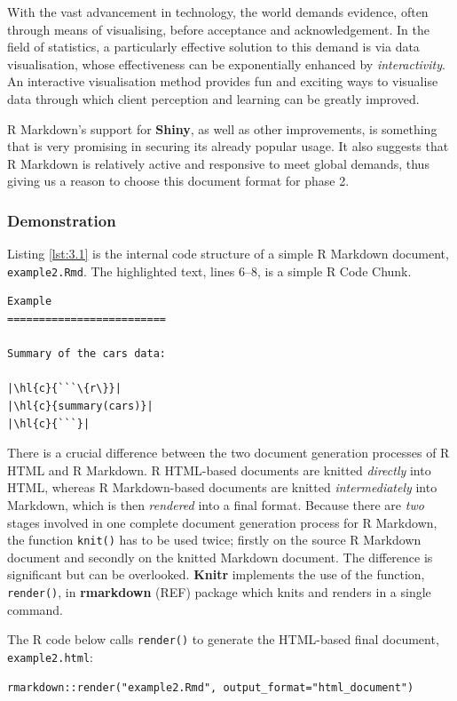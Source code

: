 \documentclass[a4paper, 12pt]{report}
\begin{document}
With the vast advancement in technology, the world demands evidence, often through means of visualising, before acceptance and acknowledgement. In the field of statistics, a particularly effective solution to this demand is via data visualisation, whose effectiveness can be exponentially enhanced by \emph{interactivity}. An interactive visualisation method provides fun and exciting ways to visualise data through which client perception and learning can be greatly improved.

R Markdown's support for \textbf{Shiny}, as well as other improvements, is something that is very promising in securing its already popular usage. It also suggests that R Markdown is relatively active and responsive to meet global demands, thus giving us a reason to choose this document format for phase 2.

\subsubsection*{Demonstration}
Listing \ref{lst:3.1} is the internal code structure of a simple R Markdown document, \texttt{example2.Rmd}. The highlighted text, lines 6--8, is a simple R Code Chunk.

\begin{lstlisting}[caption={\texttt{example2.Rmd}}, escapechar=\|, label={lst:3.1}]
Example
=========================

Summary of the cars data:

|\hl{c}{```\{r\}}|
|\hl{c}{summary(cars)}|
|\hl{c}{```}|
\end{lstlisting}

There is a crucial difference between the two document generation processes of R HTML and R Markdown. R HTML-based documents are knitted \emph{directly} into HTML, whereas R Markdown-based documents are knitted \emph{intermediately} into Markdown, which is then \emph{rendered} into a final format. Because there are \emph{two} stages involved in one complete document generation process for R Markdown, the function \texttt{knit()} has to be used twice; firstly on the source R Markdown document and secondly on the knitted Markdown document. The difference is significant but can be overlooked. \textbf{Knitr} implements the use of the function, \texttt{render()}, in \textbf{rmarkdown} (REF) package which knits and renders in a single command. 

The R code below calls \texttt{render()} to generate the HTML-based final document, \texttt{example2.html}:
\begin{lstlisting}[numbers=none, frame=none]
rmarkdown::render("example2.Rmd", output_format="html_document")
\end{lstlisting}
\end{document}
